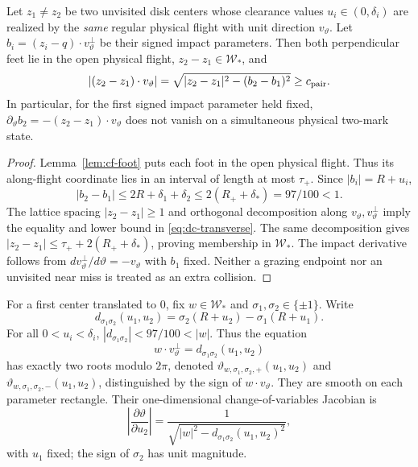 \begin{lemma}
\label{lem:dc-transverse}
Let $z_1\ne z_2$ be two unvisited disk centers whose clearance values
$u_i\in(0,\delta_i)$ are realized by the \emph{same} regular physical
flight with unit direction $v_\vartheta$.  Let
$b_i=(z_i-q)\cdot v_\vartheta^\perp$ be their signed impact parameters.
Then both perpendicular feet lie in the open physical flight,
$z_2-z_1\in\mathcal W_*$, and
\begin{equation}\label{eq:dc-transverse}
 |(z_2-z_1)\cdot v_\vartheta|
   =\sqrt{|z_2-z_1|^2-(b_2-b_1)^2}
   \ge c_{\rm pair}.
\end{equation}
In particular, for the first signed impact parameter held fixed,
$\partial_\vartheta b_2=-(z_2-z_1)\cdot v_\vartheta$ does not vanish
on a simultaneous physical two-mark state.
\end{lemma}
\begin{proof}
Lemma~\ref{lem:cf-foot} puts each foot in the open physical
flight.  Thus its along-flight coordinate lies in an interval of
length at most $\tau_+$.  Since $|b_i|=R+u_i$,
\[
 |b_2-b_1|\le 2R+\delta_1+\delta_2
       \le2(R_++\delta_*)=97/100<1.
\]
The lattice spacing $|z_2-z_1|\ge1$ and orthogonal decomposition
along $v_\vartheta,v_\vartheta^\perp$ imply the equality and lower
bound in \eqref{eq:dc-transverse}.  The same decomposition gives
$|z_2-z_1|\le\tau_++2(R_++\delta_*)$, proving membership in
$\mathcal W_*$.  The impact derivative follows from
$d v_\vartheta^\perp/d\vartheta=-v_\vartheta$ with $b_1$ fixed.
Neither a grazing endpoint nor an unvisited near miss is treated as
an extra collision.
\end{proof}

For a first center translated to $0$, fix $w\in\mathcal W_*$ and
$\sigma_1,\sigma_2\in\{\pm1\}$.  Write
\begin{equation}\label{eq:dc-delta}
 d_{\sigma_1\sigma_2}(u_1,u_2)
   =\sigma_2(R+u_2)-\sigma_1(R+u_1).
\end{equation}
For all $0<u_i<\delta_i$,
$|d_{\sigma_1\sigma_2}|<97/100<|w|$.  Thus the equation
\begin{equation}\label{eq:dc-angle-root}
 w\cdot v_\vartheta^\perp
     =d_{\sigma_1\sigma_2}(u_1,u_2)
\end{equation}
has exactly two roots modulo $2\pi$, denoted
$\vartheta_{w,\sigma_1,\sigma_2,+}(u_1,u_2)$ and
$\vartheta_{w,\sigma_1,\sigma_2,-}(u_1,u_2)$, distinguished by
the sign of $w\cdot v_\vartheta$.  They are smooth on each
parameter rectangle.  Their one-dimensional change-of-variables
Jacobian is
\begin{equation}\label{eq:dc-pair-jacobian}
 \left|\frac{\partial\vartheta}{\partial u_2}\right|
  =\frac1{\sqrt{|w|^2-d_{\sigma_1\sigma_2}(u_1,u_2)^2}},
\end{equation}
with $u_1$ fixed; the sign of $\sigma_2$ has unit magnitude.

